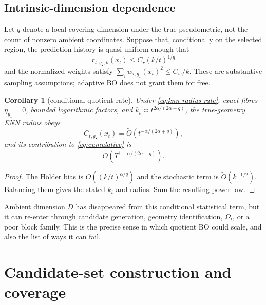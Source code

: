 \documentclass[11pt]{article}
\newtheorem{corollary}[theorem]{Corollary}
\theoremstyle{definition}
\theoremstyle{remark}
\newcommand{\1}{\mathbf 1}
\begin{document}
\subsection{Intrinsic-dimension dependence}

Let $q$ denote a local covering dimension under the true pseudometric, not the count of nonzero
ambient coordinates.  Suppose that, conditionally on the selected region, the prediction history is
quasi-uniform enough that
\begin{equation}\label{eq:knn-radius-rate}
  r_{t,g_\star,k}(x_t)\le C_r(k/t)^{1/q}
\end{equation}
and the normalized weights satisfy
$\sum_iw_{i,g_\star}(x_t)^2\le C_w/k$.  These are substantive sampling assumptions; adaptive BO
does not grant them for free.

\begin{corollary}[conditional quotient rate]\label{cor:quotient-rate}
Under \eqref{eq:knn-radius-rate}, exact fibres $\eta_{g_\star}=0$, bounded logarithmic factors, and
$k_t\asymp t^{2\alpha/(2\alpha+q)}$, the true-geometry ENN radius obeys
\begin{equation}\label{eq:radius-rate}
  C_{t,g_\star}(x_t)=\widetilde O
  \left(t^{-\alpha/(2\alpha+q)}\right),
\end{equation}
and its contribution to \eqref{eq:cumulative} is
\begin{equation}\label{eq:cumulative-rate}
  \widetilde O
  \left(T^{1-\alpha/(2\alpha+q)}\right).
\end{equation}
\end{corollary}
\begin{proof}
The H\"older bias is $O((k/t)^{\alpha/q})$ and the stochastic term is
$\widetilde O(k^{-1/2})$.  Balancing them gives the stated $k_t$ and radius.  Sum the resulting
power law.
\end{proof}

Ambient dimension $D$ has disappeared from this conditional statistical term, but it can re-enter
through candidate generation, geometry identification, $\Omega_t$, or a poor block family.  This
is the precise sense in which quotient BO could scale, and also the list of ways it can fail.

\section{Candidate-set construction and coverage}
\end{document}
